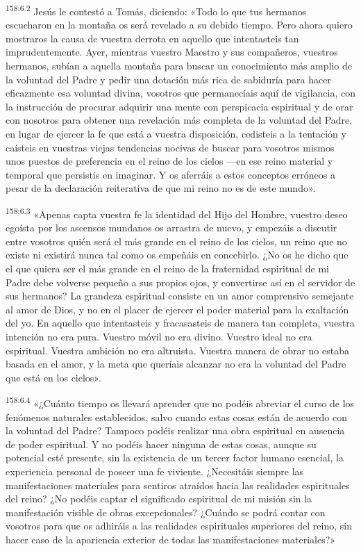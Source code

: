 \par 
\textsuperscript{158:6.2} Jesús le contestó a Tomás, diciendo: «Todo lo que tus hermanos escucharon en la montaña os será revelado a su debido tiempo. Pero ahora quiero mostraros la causa de vuestra derrota en aquello que intentasteis tan imprudentemente. Ayer, mientras vuestro Maestro y sus compañeros, vuestros hermanos, subían a aquella montaña para buscar un conocimiento más amplio de la voluntad del Padre y pedir una dotación más rica de sabiduría para hacer eficazmente esa voluntad divina, vosotros que permanecíais aquí de vigilancia, con la instrucción de procurar adquirir una mente con perspicacia espiritual y de orar con nosotros para obtener una revelación más completa de la voluntad del Padre, en lugar de ejercer la fe que está a vuestra disposición, cedisteis a la tentación y caísteis en vuestras viejas tendencias nocivas de buscar para vosotros mismos unos puestos de preferencia en el reino de los cielos ---en ese reino material y temporal que persistís en imaginar. Y os aferráis a estos conceptos erróneos a pesar de la declaración reiterativa de que mi reino no es de este mundo».

\par 
\textsuperscript{158:6.3} «Apenas capta vuestra fe la identidad del Hijo del Hombre, vuestro deseo egoísta por los ascensos mundanos os arrastra de nuevo, y empezáis a discutir entre vosotros quién será el más grande en el reino de los cielos, un reino que no existe ni existirá nunca tal como os empeñáis en concebirlo. ¿No os he dicho que el que quiera ser el más grande en el reino de la fraternidad espiritual de mi Padre debe volverse pequeño a sus propios ojos, y convertirse así en el servidor de sus hermanos? La grandeza espiritual consiste en un amor comprensivo semejante al amor de Dios, y no en el placer de ejercer el poder material para la exaltación del yo. En aquello que intentasteis y fracasasteis de manera tan completa, vuestra intención no era pura. Vuestro móvil no era divino. Vuestro ideal no era espiritual. Vuestra ambición no era altruista. Vuestra manera de obrar no estaba basada en el amor, y la meta que queríais alcanzar no era la voluntad del Padre que está en los cielos».

\par 
\textsuperscript{158:6.4} «¿Cuánto tiempo os llevará aprender que no podéis abreviar el curso de los fenómenos naturales establecidos, salvo cuando estas cosas están de acuerdo con la voluntad del Padre? Tampoco podéis realizar una obra espiritual en ausencia de poder espiritual. Y no podéis hacer ninguna de estas cosas, aunque su potencial esté presente, sin la existencia de un tercer factor humano esencial, la experiencia personal de poseer una fe viviente. ¿Necesitáis siempre las manifestaciones materiales para sentiros atraídos hacia las realidades espirituales del reino? ¿No podéis captar el significado espiritual de mi misión sin la manifestación visible de obras excepcionales? ¿Cuándo se podrá contar con vosotros para que os adhiráis a las realidades espirituales superiores del reino, sin hacer caso de la apariencia exterior de todas las manifestaciones materiales?»

